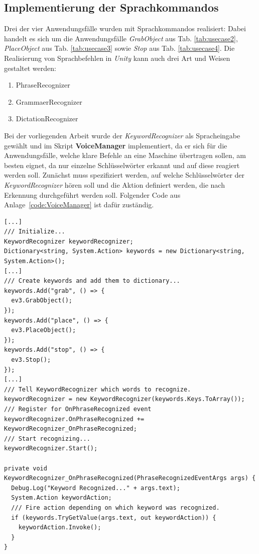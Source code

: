\subsection{Implementierung der Sprachkommandos}\label{ssec:voiceCommands}
Drei der vier Anwendungsfälle wurden mit Sprachkommandos realisiert: Dabei handelt es sich um die Anwendungsfälle \textit{GrabObject} aus Tab. \ref{tab:usecase2}, \textit{PlaceObject} aus Tab. \ref{tab:usecase3} sowie \textit{Stop} aus Tab. \ref{tab:usecase4}. Die Realisierung von Sprachbefehlen in \textit{Unity} kann auch drei Art und Weisen gestaltet werden: \begin{enumerate}
	\item PhraseRecognizer
	\item GrammaerRecognizer
	\item DictationRecognizer
\end{enumerate}
Bei der vorliegenden Arbeit wurde der \textit{KeywordRecognizer} als Spracheingabe gewählt und im Skript \textbf{VoiceManager} implementiert, da er sich für die Anwendungsfälle, welche klare Befehle an eine Maschine übertragen sollen, am besten eignet, da nur einzelne Schlüsselwörter erkannt und auf diese reagiert werden soll.
Zunächst muss spezifiziert werden, auf welche Schlüsselwörter der \textit{KeywordRecognizer} hören soll und die Aktion definiert werden, die nach Erkennung durchgeführt werden soll. Folgender Code aus Anlage~\ref{code:VoiceManager} ist dafür zuständig.
\begin{lstlisting}
[...]
/// Initialize...
KeywordRecognizer keywordRecognizer;
Dictionary<string, System.Action> keywords = new Dictionary<string, System.Action>();
[...]
/// Create keywords and add them to dictionary...
keywords.Add("grab", () => {             
  ev3.GrabObject();
});
keywords.Add("place", () => {             
  ev3.PlaceObject();
});
keywords.Add("stop", () => {             
  ev3.Stop();
});
[...]
/// Tell KeywordRecognizer which words to recognize.
keywordRecognizer = new KeywordRecognizer(keywords.Keys.ToArray());
/// Register for OnPhraseRecognized event
keywordRecognizer.OnPhraseRecognized += KeywordRecognizer_OnPhraseRecognized;
/// Start recognizing...    
keywordRecognizer.Start();

private void KeywordRecognizer_OnPhraseRecognized(PhraseRecognizedEventArgs args) {
  Debug.Log("Keyword Recognized..." + args.text);
  System.Action keywordAction;
  /// Fire action depending on which keyword was recognized.
  if (keywords.TryGetValue(args.text, out keywordAction)) {
	keywordAction.Invoke();
  }
}
\end{lstlisting}
